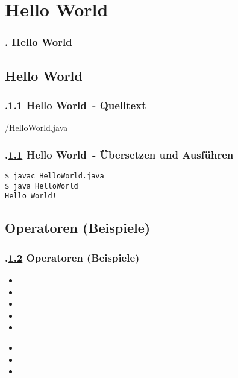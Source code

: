 \def\stitle{Hello World}
\section{\stitle}
\begin{frame}
  \frametitle{\kap. \stitle}%
\tableofcontents[current]
\end{frame}


\subsection{Hello World}\label{S:helloWorld}
\begin{frame}[fragile]%
  \frametitle{\kap.\ref{S:helloWorld} \stitle\ - Quelltext}%


{\getexercisefolder /HelloWorld.java}
\end{frame}


\begin{frame}[fragile]%
  \frametitle{\kap.\ref{S:helloWorld} \stitle\ - \"Ubersetzen und Ausf\"uhren}%

\begin{lstlisting}[title={Um das Programm HelloWorld auszuf\"uhren werden folgende Schritte auf dem Terminal durchgef\"uhrt.},style=BASH]
$ javac HelloWorld.java
$ java HelloWorld
Hello World!
\end{lstlisting}
\end{frame}


\def\stitle{Operatoren (Beispiele)}%
\subsection{\stitle}\label{S:operator}
\begin{frame}[t]%
  \frametitle{\kap.\ref{S:operator} \stitle}%
\medskip
{}
\begin{itemize}
\item {}
\item {}
\item {}
\item {}
\item {}
\end{itemize}
\medskip
{}
\begin{itemize}
\item {}
\item {}
\item {}
\end{itemize}
\end{frame}



